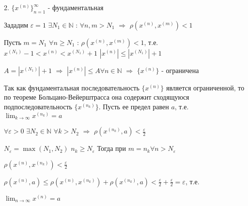 \vspace{0.5cm}

2. $\{x^{(n)}\}_{n=1}^{\infty}$ - фундаментальная 

Зададим $\varepsilon = 1$ $\exists N_1 \in \mathbb {N}$ : $\forall n, m > N_1$ $\Rightarrow$ $\rho (x^{(n)}, x^{(m)})  < 1$

Пусть $m = N_1$  $\forall n \ge N_1$ : $\rho (x^{(n)}, x^{(m)})  < 1$, т.е. $x^{(N_1)} - 1 < x^{(n)} < x^{(N_1)} + 1$ $|x^{(n)}| \leq |x^{(N_1)}| + 1$

$A =  |x^{(N_1)}| + 1$ $\Rightarrow$ $|x^{(n)}| \leq A \forall n \in \mathbb {N} $  $\Rightarrow$ $\{x^{(n)}\}$ - ограничена 

Так как фундаментальная последовательность $\{x^{(n)}\}$ является ограниченной, то по теореме Больцано-Вейерштрасса она содержит сходящуюся подпоследовательность $\{x^{({n_k})}\}$. Пусть ее предел равен $a$, т.е. $\lim_{k\to\infty} x^{(n_k)} = a$

$\forall \varepsilon > 0$ $\exists N_2 \in \mathbb {N}$ $\forall k > N_2$ $\Rightarrow$ $\rho (x^{(n_k)}, a)  < \frac{\varepsilon}{2}$

$N_\varepsilon = \max(N_1, N_2)$ 
$n_k \ge N_\varepsilon$
Тогда при $m = n_k \forall n > N_\varepsilon$ 

$\rho (x^{(n)}, x^{(n_k)}) < \frac{\varepsilon}{2}$

$\rho (x^{(n)}, a) \leq \rho (x^{(n)}, x^{(n_k)}) + \rho (x^{(n_k)}, a) < \frac{\varepsilon}{2} + \frac{\varepsilon}{2} = \varepsilon$, т.е.

$\lim_{n\to\infty} x^{(n)} = a$
